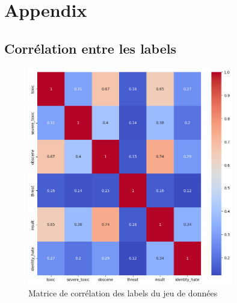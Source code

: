 
\chapter{Appendix}
\label{chap:appendix}

\section{Corrélation entre les labels}
\begin{figure}[h]
    \centering
    \includegraphics[width=0.8\textwidth]{figures/matrice-correlation.png}
    \caption{Matrice de corrélation des labels du jeu de données}
\end{figure}

\newpage
